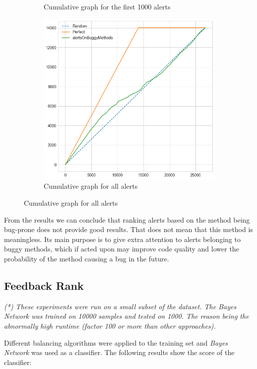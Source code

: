\begin{figure}[H]
\begin{subfigure}{.5\textwidth}
		\caption{Cumulative graph for the first 1000 alerts}\label{}
	\end{subfigure}%
	\begin{subfigure}{.5\textwidth}
		\centering
		\includegraphics[scale=0.3]{./src/methodBug/methodbug_cumulative_graph_all.png}
		\caption{Cumulative graph for all alerts}\label{}
	\end{subfigure}  
\end{figure}

From the results we can conclude that ranking alerts based on the method being bug-prone does not provide good results. That does not mean that this method is meaningless. Its main purpose is to give extra attention to alerts belonging to buggy methods, which if acted upon may improve code quality and lower the probability of the method causing a bug in the future.

\subsection{Feedback Rank}

\textit{(*) These experiments were run on a small subset of the dataset. The Bayes Network was trained on 10000 samples and tested on 1000. The reason being the abnormally high runtime (factor 100 or more than other approaches).}

Different balancing algorithms were applied to the training set and \textit{Bayes Network} was used as a classifier. The following results show the score of the classifier:

